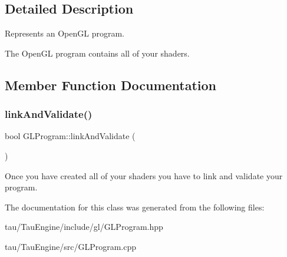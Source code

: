 \subsection{Detailed Description}
Represents an Open\+GL program.

The Open\+GL program contains all of your shaders. 

\subsection{Member Function Documentation}
\mbox{\label{class_g_l_program_a17292d63b8a7a6711ca75a1d3dfe9afa}} 
\subsubsection{\texorpdfstring{link\+And\+Validate()}{linkAndValidate()}}
{\footnotesize\ttfamily bool G\+L\+Program\+::link\+And\+Validate (\begin{DoxyParamCaption}{ }\end{DoxyParamCaption})\hspace{0.3cm}{\ttfamily [noexcept]}}

Once you have created all of your shaders you have to link and validate your program. 

The documentation for this class was generated from the following files\+:\begin{DoxyCompactItemize}
\item 
tau/\+Tau\+Engine/include/gl/G\+L\+Program.\+hpp\item 
tau/\+Tau\+Engine/src/G\+L\+Program.\+cpp\end{DoxyCompactItemize}

